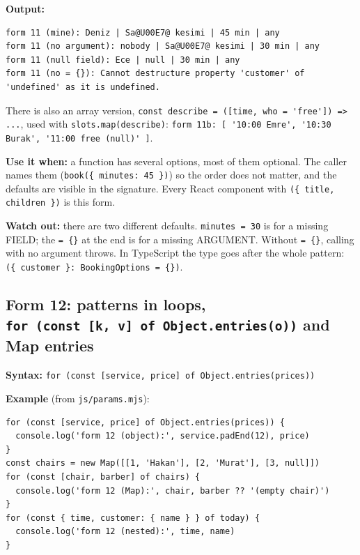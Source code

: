 \textbf{Output:}

\begin{lstlisting}
form 11 (mine): Deniz | Sa@U00E7@ kesimi | 45 min | any
form 11 (no argument): nobody | Sa@U00E7@ kesimi | 30 min | any
form 11 (null field): Ece | null | 30 min | any
form 11 (no = {}): Cannot destructure property 'customer' of 'undefined' as it is undefined.
\end{lstlisting}

There is also an array version, \passthrough{\lstinline!const describe = ([time, who = 'free']) => ...!}, used with \passthrough{\lstinline!slots.map(describe)!}:
\passthrough{\lstinline!form 11b: [ '10:00 Emre', '10:30 Burak', '11:00 free (null)' ]!}.

\textbf{Use it when:} a function has several options, most of them optional. The caller names them
(\passthrough{\lstinline!book(\{ minutes: 45 \})!}) so the order does not matter, and the defaults are visible in the signature.
Every React component with \passthrough{\lstinline!(\{ title, children \})!} is this form.

\textbf{Watch out:} there are two different defaults. \passthrough{\lstinline!minutes = 30!} is for a missing FIELD;
the \passthrough{\lstinline!= \{\}!} at the end is for a missing ARGUMENT. Without \passthrough{\lstinline!= \{\}!}, calling with no argument throws.
In TypeScript the type goes after the whole pattern: \passthrough{\lstinline!(\{ customer \}: BookingOptions = \{\})!}.

\subsection{\texorpdfstring{Form 12: patterns in loops, \texttt{for\ (const\ {[}k,\ v{]}\ of\ Object.entries(o))} and Map entries}{Form 12: patterns in loops, for (const {[}k, v{]} of Object.entries(o)) and Map entries}}\label{form-12-patterns-in-loops-for-const-k-v-of-object.entrieso-and-map-entries}

\textbf{Syntax:} \passthrough{\lstinline!for (const [service, price] of Object.entries(prices))!}

\textbf{Example} (from \passthrough{\lstinline!js/params.mjs!}):

\begin{lstlisting}
for (const [service, price] of Object.entries(prices)) {
  console.log('form 12 (object):', service.padEnd(12), price)
}
const chairs = new Map([[1, 'Hakan'], [2, 'Murat'], [3, null]])
for (const [chair, barber] of chairs) {
  console.log('form 12 (Map):', chair, barber ?? '(empty chair)')
}
for (const { time, customer: { name } } of today) {
  console.log('form 12 (nested):', time, name)
}
\end{lstlisting}

